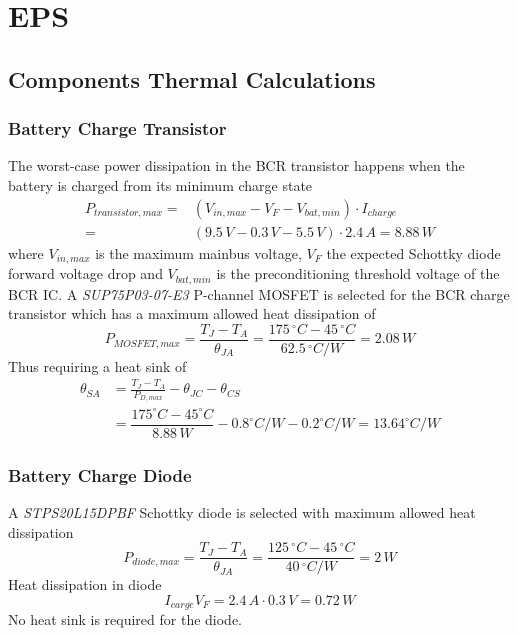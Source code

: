 \appendix

\chapter{EPS}\label{app:EPS}
%
\section{Components Thermal Calculations}
%
\subsection*{Battery Charge Transistor}
\label{app:BCR_trans_max_heat_dissipation}
%
The worst-case power dissipation in the \ac{BCR} transistor happens when the battery is charged from its minimum charge state
%
\begin{equation}
\label{eq:BCR_trans_max_heat_dissipation}
\begin{split}
P_{transistor,max}=&(V_{in,max}-V_F-V_{bat,min})\cdot I_{charge}\\
=&(9.5\,V-0.3\,V-5.5\,V)\cdot 2.4\,A=8.88\,W
\end{split}
\end{equation}
%
where $V_{in,max}$ is the maximum mainbus voltage, $V_F$ the expected Schottky diode forward voltage drop and $V_{bat,min}$ is the preconditioning threshold voltage of the \ac{BCR} \ac{IC}. A \textit{SUP75P03-07-E3} P-channel MOSFET is selected for the \ac{BCR} charge transistor which has a maximum allowed heat dissipation of
%
\begin{equation}
P_{MOSFET,max}=\dfrac{T_J-T_A}{\theta _{JA}}=\dfrac{175\,^{\circ}C-45\,^{\circ}C}{62.5\,^{\circ}C/W}=2.08\,W
\end{equation}
%
Thus requiring a heat sink of 
%
\begin{equation}
\begin{split}
\theta_{SA} &= \frac{T_J-T_A}{P_{D,max}} - \theta_{JC} -\theta_{CS}\\ 
&=\dfrac{175^{\circ}C-45^{\circ}C}{8.88\,W}-0.8^{\circ}C/W-0.2^{\circ}C/W=13.64^{\circ}C/W
\end{split}
\end{equation}
%
%
\subsection*{Battery Charge Diode}
\label{app:BCR_diode_max_heat_dissipation}
%
A \textit{STPS20L15DPBF} Schottky diode is selected with maximum allowed heat dissipation 
%
\begin{equation}
P_{diode,max}=\dfrac{T_J-T_A}{\theta _{JA}}=\dfrac{125\,^{\circ}C-45\,^{\circ}C}{40\,^{\circ}C/W}=2\,W
\end{equation}
%
Heat dissipation in diode
%
\begin{equation}
I_{carge}V_F=2.4\,A\cdot 0.3\,V=0.72\,W
\end{equation}
%
No heat sink is required for the diode.
%
%
